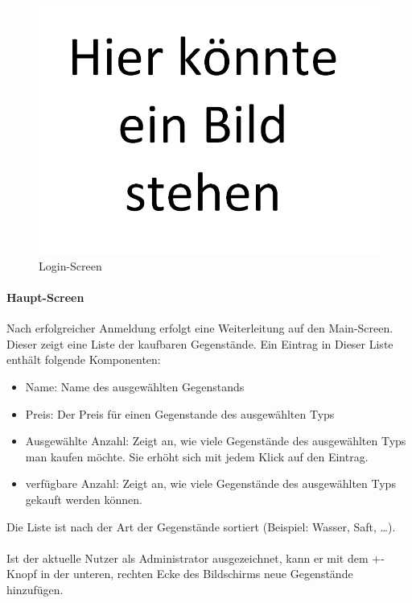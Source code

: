 \documentclass{scrartcl}
\begin{document}
		\begin{figure}[!h]
			\label{loginscreen}
			\centering
			\includegraphics[scale=0.5]{./figures/placeholder.png}
			\caption{Login-Screen}
		\end{figure}
	
		\paragraph*{Haupt-Screen}
		Nach erfolgreicher Anmeldung erfolgt eine Weiterleitung auf den Main-Screen. Dieser zeigt eine Liste der kaufbaren Gegenstände. Ein Eintrag in Dieser Liste enthält folgende Komponenten:
		
		\begin{itemize}
			\item Name: Name des ausgewählten Gegenstands
			
			\item Preis: Der Preis für einen Gegenstande des ausgewählten Typs
			
			\item Ausgewählte Anzahl: Zeigt an, wie viele Gegenstände des ausgewählten Typs man kaufen möchte. Sie erhöht sich mit jedem Klick auf den Eintrag.
			
			\item verfügbare Anzahl: Zeigt an, wie viele Gegenstände des ausgewählten Typs gekauft werden können. 
		\end{itemize}
	
		Die Liste ist nach der Art der Gegenstände sortiert (Beispiel: Wasser, Saft, \ldots).
		
		\paragraph*{}
		Ist der aktuelle Nutzer als Administrator ausgezeichnet, kann er mit dem +-Knopf in der unteren, rechten Ecke des Bildschirms neue Gegenstände hinzufügen.
		
\end{document}
